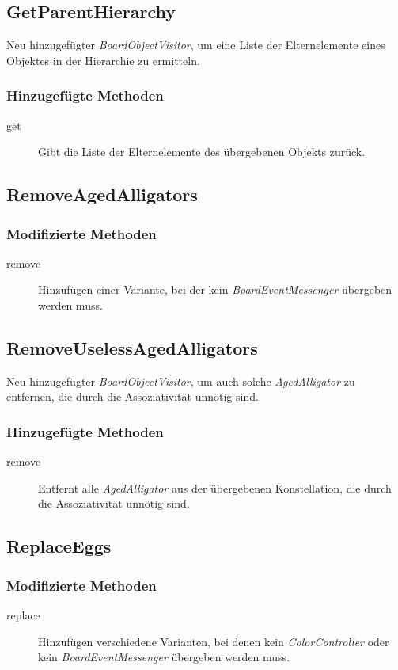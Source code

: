 \subsection{GetParentHierarchy}
Neu hinzugefügter \emph{BoardObjectVisitor}, um eine Liste der Elternelemente eines Objektes in der Hierarchie zu ermitteln.

\subsubsection{Hinzugefügte Methoden}
\begin{description}
\item[get]
Gibt die Liste der Elternelemente des übergebenen Objekts zurück.
\end{description}


\subsection{RemoveAgedAlligators}

\subsubsection{Modifizierte Methoden}
\begin{description}
\item[remove]
Hinzufügen einer Variante, bei der kein \emph{BoardEventMessenger} übergeben werden muss.
\end{description}


\subsection{RemoveUselessAgedAlligators}
Neu hinzugefügter \emph{BoardObjectVisitor}, um auch solche \emph{AgedAlligator} zu entfernen, die durch die Assoziativität unnötig sind.

\subsubsection{Hinzugefügte Methoden}
\begin{description}
\item[remove]
Entfernt alle \emph{AgedAlligator} aus der übergebenen Konstellation, die durch die Assoziativität unnötig sind.
\end{description}



\subsection{ReplaceEggs}

\subsubsection{Modifizierte Methoden}
\begin{description}
\item[replace]
Hinzufügen verschiedene Varianten, bei denen kein \emph{ColorController} oder kein \emph{BoardEventMessenger} übergeben werden muss.
\end{description}
